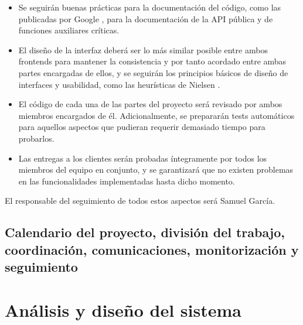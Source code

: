 \documentclass[12pt, a4paper, titlepage]{article}
\begin{document}
\begin{itemize}
    \item Se seguirán buenas prácticas para la documentación del código, como las publicadas por Google \cite{documentaciongoogle}, para la documentación de la API pública y de funciones auxiliares críticas.
    
    \item El diseño de la interfaz deberá ser lo más similar posible entre ambos frontends para mantener la consistencia y por tanto acordado entre ambas partes encargadas de ellos, y se seguirán los principios básicos de diseño de interfaces y usabilidad, como las heurísticas de Nielsen \cite{heuristicasnielsen}.
    
    \item El código de cada una de las partes del proyecto será revisado por ambos miembros encargados de él. Adicionalmente, se prepararán tests automáticos para aquellos aspectos que pudieran requerir demasiado tiempo para probarlos.
    
    \item Las entregas a los clientes serán probadas íntegramente por todos los miembros del equipo en conjunto, y se garantizará que no existen problemas en las funcionalidades implementadas hasta dicho momento.
\end{itemize}

El responsable del seguimiento de todos estos aspectos será Samuel García.



\subsection{Calendario del proyecto, división del trabajo, coordinación, comunicaciones, monitorización y seguimiento}

\section{Análisis y diseño del sistema}
\end{document}
